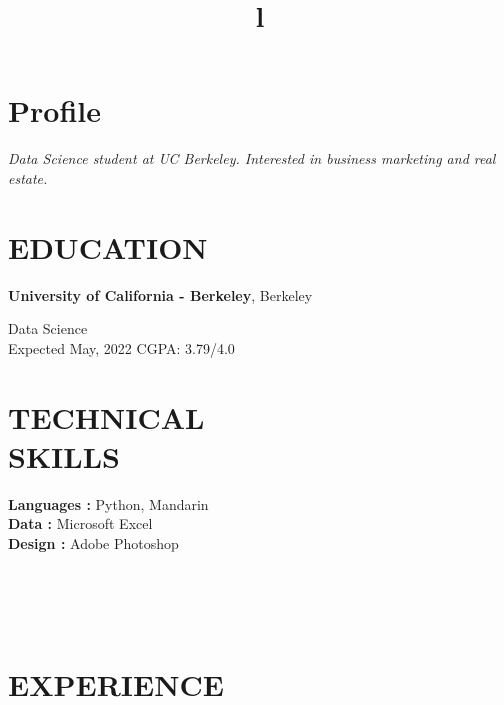 \documentclass[margin]{res}
\begin{document}



\address{\\LinkedIn : www.linkedin.com/in/ryanhu06
\\23719 Ridge Line Rd, Diamond Bar, CA 91765\\
}
\address{ryanhu22@berkeley.edu \\(626) 862-8312\\}



\begin{resume}


\section{Profile}
{\sl Data Science student at UC Berkeley. Interested in business marketing and real estate. }

\section{EDUCATION}
\textbf{University of California - Berkeley}, Berkeley

Data Science\\
Expected May, 2022
\hfill CGPA: 3.79/4.0\\






\section{TECHNICAL\\SKILLS}

\textbf{Languages : } Python, Mandarin
\\
\textbf{Data :} Microsoft Excel
\\
\textbf{Design : } Adobe Photoshop
\\



\begin{format}
\title{l}\\
\\
\body\\
\end{format}


\section{EXPERIENCE}


\end{resume}
\end{document}
